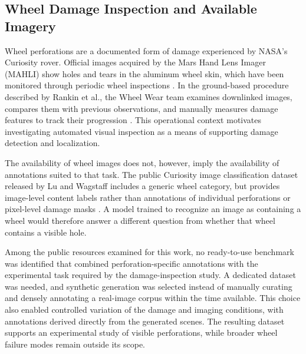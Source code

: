 
\subsection{Wheel Damage Inspection and Available Imagery}

Wheel perforations are a documented form of damage experienced by NASA's Curiosity rover. Official images acquired by the Mars Hand Lens Imager (MAHLI) show holes and tears in the aluminum wheel skin, which have been monitored through periodic wheel inspections \cite{nasa2016wheelinspection}. In the ground-based procedure described by Rankin et al., the Wheel Wear team examines downlinked images, compares them with previous observations, and manually measures damage features to track their progression \cite{rankin2022wheelassessment}. This operational context motivates investigating automated visual inspection as a means of supporting damage detection and localization.

The availability of wheel images does not, however, imply the availability of annotations suited to that task. The public Curiosity image classification dataset released by Lu and Wagstaff includes a generic wheel category, but provides image-level content labels rather than annotations of individual perforations or pixel-level damage masks \cite{lu2020mslimages}. A model trained to recognize an image as containing a wheel would therefore answer a different question from whether that wheel contains a visible hole.

Among the public resources examined for this work, no ready-to-use benchmark was identified that combined perforation-specific annotations with the experimental task required by the damage-inspection study. A dedicated dataset was needed, and synthetic generation was selected instead of manually curating and densely annotating a real-image corpus within the time available. This choice also enabled controlled variation of the damage and imaging conditions, with annotations derived directly from the generated scenes. The resulting dataset supports an experimental study of visible perforations, while broader wheel failure modes remain outside its scope.

